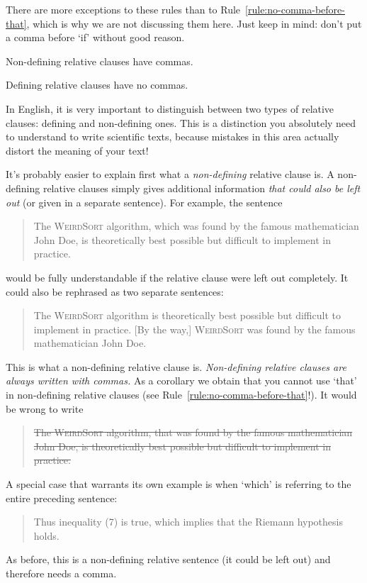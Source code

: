 There are more exceptions to these rules than to
Rule~\ref{rule:no-comma-before-that}, which is why we are not
discussing them here. Just keep in mind: don't put a comma before `if'
without good reason.

\begin{Rule}
	\label{rule:non-defining-has-comma}
	Non-defining relative clauses have commas.
\end{Rule}
\begin{Rule}
	\label{rule:defining-without-comma}
	Defining relative clauses have no commas.
\end{Rule}

In English, it is very important to distinguish between two types of
relative clauses: defining and non-defining ones. This is a
distinction you absolutely need to understand to write scientific
texts, because mistakes in this area actually distort the meaning of
your text!

It's probably easier to explain first what a \emph{non-defining}
relative clause is. A non-defining relative clauses simply gives
additional information \emph{that could also be left out} (or given in
a separate sentence). For example, the sentence
\begin{quote}
	The \textsc{WeirdSort} algorithm, which was found by the famous
	mathematician John Doe, is theoretically best possible but difficult
	to implement in practice.
\end{quote}
would be fully understandable if the relative clause were left out
completely. It could also be rephrased as two separate sentences:
\begin{quote}
	The \textsc{WeirdSort} algorithm is theoretically best possible but
	difficult to implement in practice. [By the way,] \textsc{WeirdSort}
	was found by the famous mathematician John Doe.
\end{quote}
This is what a non-defining relative clause is. \emph{Non-defining
	relative clauses are always written with commas.} As a corollary we
obtain that you cannot use `that' in non-defining relative clauses
(see Rule~\ref{rule:no-comma-before-that}!). It would be wrong to
write
\begin{quote}
	\st{The \textsc{WeirdSort} algorithm, that was found by the famous
		mathematician John Doe, is theoretically best possible but
		difficult to implement in practice.}
\end{quote}
A special case that warrants its own example is when `which' is
referring to the entire preceding sentence:
\begin{quote}
	Thus inequality (7) is true, which implies that the Riemann
	hypothesis holds.
\end{quote}
As before, this is a non-defining relative sentence (it could be left
out) and therefore needs a comma.


